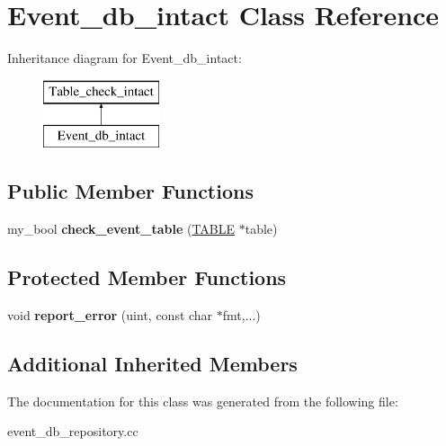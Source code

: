 \hypertarget{classEvent__db__intact}{}\section{Event\+\_\+db\+\_\+intact Class Reference}
\label{classEvent__db__intact}
Inheritance diagram for Event\+\_\+db\+\_\+intact\+:\begin{figure}[H]
\begin{center}
\leavevmode
\includegraphics[height=2.000000cm]{classEvent__db__intact}
\end{center}
\end{figure}
\subsection*{Public Member Functions}
\begin{DoxyCompactItemize}
\item 
my\+\_\+bool {\bfseries check\+\_\+event\+\_\+table} (\mbox{\hyperlink{structTABLE}{T\+A\+B\+LE}} $\ast$table)
\end{DoxyCompactItemize}
\subsection*{Protected Member Functions}
\begin{DoxyCompactItemize}
\item 
\mbox{\label{classEvent__db__intact_a12716de314f750413ea6bc3c71d6d3af}} 
void {\bfseries report\+\_\+error} (uint, const char $\ast$fmt,...)
\end{DoxyCompactItemize}
\subsection*{Additional Inherited Members}


The documentation for this class was generated from the following file\+:\begin{DoxyCompactItemize}
\item 
event\+\_\+db\+\_\+repository.\+cc\end{DoxyCompactItemize}
